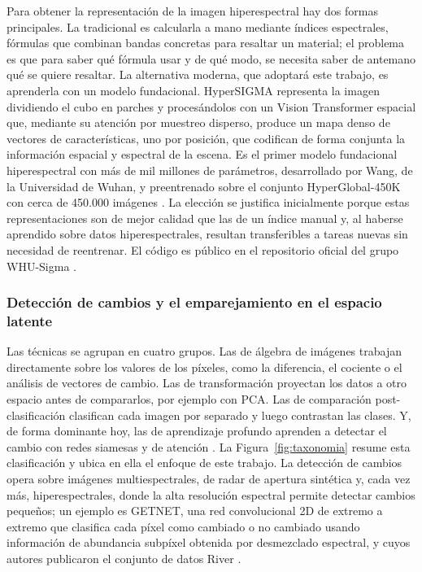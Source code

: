 Para obtener la representación de la imagen hiperespectral hay dos formas principales. La tradicional es calcularla a mano mediante índices espectrales, fórmulas que combinan bandas concretas para resaltar un material; el problema es que para saber qué fórmula usar y de qué modo, se necesita saber de antemano qué se quiere resaltar. La alternativa moderna, que adoptará este trabajo, es aprenderla con un modelo fundacional. HyperSIGMA representa la imagen dividiendo el cubo en parches y procesándolos con un Vision Transformer espacial que, mediante su atención por muestreo disperso, produce un mapa denso de vectores de características, uno por posición, que codifican de forma conjunta la información espacial y espectral de la escena. Es el primer modelo fundacional hiperespectral con más de mil millones de parámetros, desarrollado por Wang, de la Universidad de Wuhan, y preentrenado sobre el conjunto HyperGlobal-450K con cerca de 450.000 imágenes \parencite{wang2024hypersigma}. La elección se justifica inicialmente porque estas representaciones son de mejor calidad que las de un índice manual y, al haberse aprendido sobre datos hiperespectrales, resultan transferibles a tareas nuevas sin necesidad de reentrenar. El código es público en el repositorio oficial del grupo WHU-Sigma \parencite{whu2024hypersigma_repo}.

\subsubsection{Detección de cambios y el emparejamiento en el espacio latente}

Las técnicas se agrupan en cuatro grupos. Las de álgebra de imágenes trabajan directamente sobre los valores de los píxeles, como la diferencia, el cociente o el análisis de vectores de cambio. Las de transformación proyectan los datos a otro espacio antes de compararlos, por ejemplo con PCA. Las de comparación post-clasificación clasifican cada imagen por separado y luego contrastan las clases. Y, de forma dominante hoy, las de aprendizaje profundo aprenden a detectar el cambio con redes siamesas y de atención \parencite{khelifi2020deep}. La Figura~\ref{fig:taxonomia} resume esta clasificación y ubica en ella el enfoque de este trabajo. La detección de cambios opera sobre imágenes multiespectrales, de radar de apertura sintética y, cada vez más, hiperespectrales, donde la alta resolución espectral permite detectar cambios pequeños; un ejemplo es GETNET, una red convolucional 2D de extremo a extremo que clasifica cada píxel como cambiado o no cambiado usando información de abundancia subpíxel obtenida por desmezclado espectral, y cuyos autores publicaron el conjunto de datos River \parencite{wang2019getnet}.

